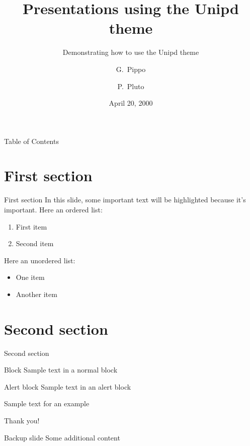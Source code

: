 \documentclass{beamer}
\title{Presentations using the Unipd theme}
\subtitle{Demonstrating how to use the Unipd theme}
\author[Pippo, Pluto]{G.~Pippo \and P.~Pluto}
\date{April 20, 2000}
\begin{document}
\frame{\titlepage}

\begin{frame}{Table of Contents}
    \tableofcontents    
\end{frame}

\section{First section}

    \begin{frame}{First section}
        In this slide, some important text will be
        \alert{highlighted} because it's important.
        Here an ordered list:
        \begin{enumerate}
            \item First item
            \item Second item
        \end{enumerate}
        Here an unordered list: 
        \begin{itemize}
            \item One item
            \item Another item
        \end{itemize}
    \end{frame}
    
\section{Second section}

    \begin{frame}{Second section}
        \begin{block}{Block}
            Sample text in a normal block
        \end{block}
   
        \begin{alertblock}{Alert block}
            Sample text in an alert block
        \end{alertblock}    
        
         \begin{example}
            Sample text for an example
        \end{example}
    \end{frame}

    
    \begin{emptyframe}
        Thank you!
    \end{emptyframe}

    \appendix

    \begin{frame}{Backup slide}
        Some additional content
    \end{frame}
    
\end{document}
